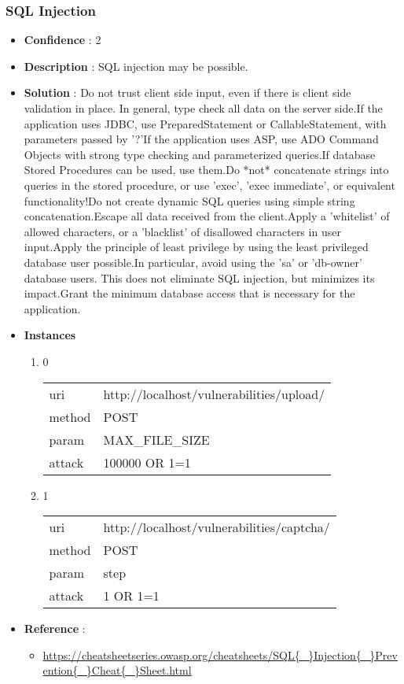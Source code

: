 \documentclass[10pt]{article}
\begin{document}
\subsubsection{SQL Injection}
\begin{itemize}
\item[] \textbf{Confidence} : 2
\item[] \textbf{Description} : SQL injection may be possible.
\item[] \textbf{Solution} :  Do not trust client side input, even if there is client side validation in place.  In general, type check all data on the server side.If the application uses JDBC, use PreparedStatement or CallableStatement, with parameters passed by '?'If the application uses ASP, use ADO Command Objects with strong type checking and parameterized queries.If database Stored Procedures can be used, use them.Do *not* concatenate strings into queries in the stored procedure, or use 'exec', 'exec immediate', or equivalent functionality!Do not create dynamic SQL queries using simple string concatenation.Escape all data received from the client.Apply a 'whitelist' of allowed characters, or a 'blacklist' of disallowed characters in user input.Apply the principle of least privilege by using the least privileged database user possible.In particular, avoid using the 'sa' or 'db-owner' database users. This does not eliminate SQL injection, but minimizes its impact.Grant the minimum database access that is necessary for the application.
\item[] \textbf{Instances}
\begin{enumerate}
\item[] 0
\begin{tabular}{| l | p{14cm}}
uri & http://localhost/vulnerabilities/upload/ \\
method & POST \\
param & MAX{\_}FILE{\_}SIZE \\
attack & 100000 OR 1=1 \\
\end{tabular}
\item[] 1
\begin{tabular}{| l | p{14cm}}
uri & http://localhost/vulnerabilities/captcha/ \\
method & POST \\
param & step \\
attack & 1 OR 1=1 \\
\end{tabular}
\end{enumerate}
\item[] \textbf{Reference} : 
\begin{itemize}
\item \url{https://cheatsheetseries.owasp.org/cheatsheets/SQL{\_}Injection{\_}Prevention{\_}Cheat{\_}Sheet.html}
\end{itemize}
\end{itemize}
\end{document}
